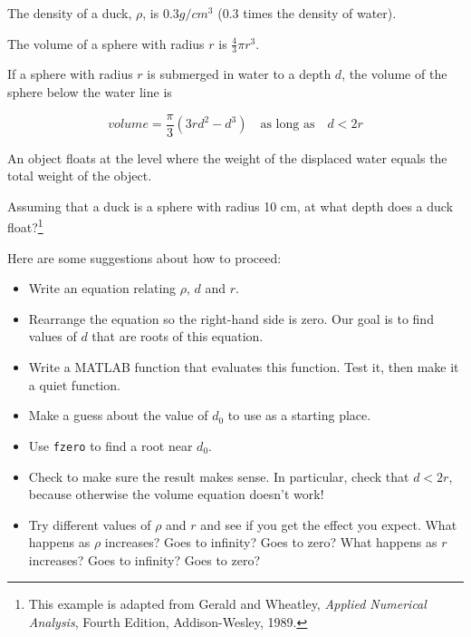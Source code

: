 \documentclass{book}
\begin{document}
\begin{ex}
\label{duck}

The density of a duck, $\rho$, is $0.3 g / cm^3$ (0.3 times the
density of water).

The volume of a sphere with radius $r$ is $\frac{4}{3} \pi r^3$.

If a sphere with radius $r$ is submerged in water to a depth $d$, the
volume of the sphere below the water line is

\begin{equation}
volume = \frac{\pi}{3} (3r d^2 - d^3) \quad
\mbox{as long as} \quad d < 2 r
\end{equation}

An object floats at the level where the weight of the displaced water
equals the total weight of the object.

Assuming that a duck is a sphere with radius 10 cm, at what depth does
a duck float?\footnote{This example is adapted from Gerald and Wheatley,
{\em Applied Numerical Analysis}, Fourth Edition, Addison-Wesley,
1989.}

Here are some suggestions about how to proceed:

\begin{itemize}

\item Write an equation relating $\rho$, $d$ and $r$.

\item Rearrange the equation so the right-hand side is zero.
Our goal is to find values of $d$ that are roots of this equation.

\item Write a MATLAB function that evaluates this function.  Test it,
   then make it a quiet function.

\item Make a guess about the value of $d_0$ to use as a starting place.

\item Use {\tt fzero} to find a root near $d_0$.

\item Check to make sure the result makes sense.  In particular,
   check that $d < 2 r$, because otherwise the volume equation
   doesn't work!

\item Try different values of $\rho$ and $r$ and see if you get the
effect you expect.  What happens as $\rho$ increases?  Goes to
infinity?  Goes to zero?  What happens as $r$ increases?  Goes to
infinity?  Goes to zero?

\end{itemize}


\end{ex}
\end{document}
